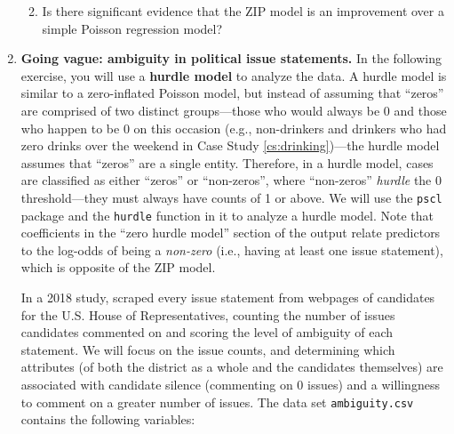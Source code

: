 \documentclass[
]{krantz}
\providecommand{\tightlist}{%
  \setlength{\itemsep}{0pt}\setlength{\parskip}{0pt}}
\begin{document}
\begin{enumerate}
  \begin{enumerate}
  \def\labelenumii{\alph{enumii}.}
  \setcounter{enumii}{2}
  \tightlist
  \item
    Is there significant evidence that the ZIP model is an improvement over a simple Poisson regression model?
  \end{enumerate}
\item
  \textbf{Going vague: ambiguity in political issue statements.} In the following exercise, you will use a \textbf{hurdle model}  to analyze the data. A hurdle model is similar to a zero-inflated Poisson model, but instead of assuming that ``zeros'' are comprised of two distinct groups---those who would always be 0 and those who happen to be 0 on this occasion (e.g., non-drinkers and drinkers who had zero drinks over the weekend in Case Study \ref{cs:drinking})---the hurdle model assumes that ``zeros'' are a single entity. Therefore, in a hurdle model, cases are classified as either ``zeros'' or ``non-zeros'', where ``non-zeros'' \emph{hurdle} the 0 threshold---they must always have counts of 1 or above. We will use the \texttt{pscl} package and the \texttt{hurdle} function in it to analyze a hurdle model. Note that coefficients in the ``zero hurdle model'' section of the output relate predictors to the log-odds of being a \emph{non-zero} (i.e., having at least one issue statement), which is opposite of the ZIP model.

  In a 2018 study, \citet{Chapp2018} scraped every issue statement from webpages of candidates for the U.S. House of Representatives, counting the number of issues candidates commented on and scoring the level of ambiguity of each statement. We will focus on the issue counts, and determining which attributes (of both the district as a whole and the candidates themselves) are associated with candidate silence (commenting on 0 issues) and a willingness to comment on a greater number of issues. The data set \texttt{ambiguity.csv} contains the following variables:


\end{enumerate}
\end{document}
